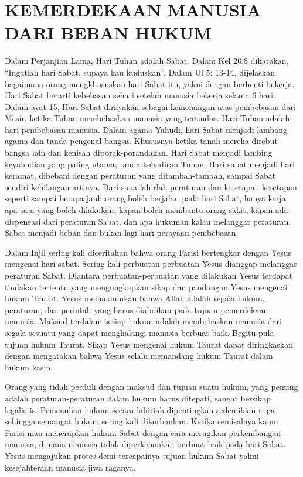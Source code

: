 \newpage
\section*{KEMERDEKAAN MANUSIA DARI BEBAN HUKUM}
	Dalam Perjanjian Lama, Hari Tuhan adalah Sabat. Dalam Kel 20:8 dikatakan, “Ingatlah hari Sabat, supaya kau kuduskan”. Dalam Ul 5: 13-14, dijelaskan bagaimana orang mengkhususkan hari Sabat itu, yakni dengan berhenti bekerja. Hari Sabat berarti kebebasan sehari setelah manusia bekerja selama 6 hari. Dalam ayat 15, Hari Sabat dirayakan sebagai kemenangan atas pembebasan dari Mesir, ketika Tuhan membebaskan manusia yang tertindas. Hari Tuhan adalah hari pembebasan manusia. Dalam agama Yahudi, hari Sabat menjadi lambang agama dan tanda pengenal bangsa. Khususnya ketika tanah mereka direbut bangsa lain dan kenisah diporak-porandakan. Hari Sabat menjadi lambing keyahudian yang paling utama, tanda kehadiran Tuhan. Hari sabat menjadi hari keramat, dibebani dengan peraturan yang ditambah-tambah, sampai Sabat sendiri kehilangan artinya. Dari sana lahirlah peraturan dan ketetapan-ketetapan seperti sampai berapa jauh orang boleh berjalan pada hari Sabat, hanya kerja apa saja yang boleh dilakukan, kapan boleh membantu orang sakit, kapan ada dispensasi dari peraturan Sabat, dan apa hukuman kalau melanggar peraturan. Sabat menjadi beban dan bukan lagi hari perayaan pembebasan.

Dalam Injil sering kali diceritakan bahwa orang Farisi bertengkar dengan Yesus mengenai hari sabat. Sering kali perbuatan-perbuatan Yesus dianggap melanggar peraturan Sabat. Diantara perbuatan-perbuatan yang dilakukan Yesus terdapat tindakan tertentu yang mengungkapkan sikap dan pandangan Yesus mengenai hukum Taurat. Yesus memaklumkan bahwa Allah adalah segala hukum, peraturan, dan perintah yang harus diabdikan pada tujuan pemerdekaan manusia. Maksud terdalam setiap hukum adalah membebaskan manusia dari segala sesuatu yang dapat menghalangi manusia berbuat baik. Begitu pula tujuan hukum Taurat. Sikap Yesus mengenai hukum Taurat dapat diringkaskan dengan mengatakan bahwa Yesus selalu memandang hukum Taurat dalam hukum kasih.

	Orang yang tidak perduli dengan maksud dan tujuan suatu hukum, yang penting adalah peraturan-peraturan dalam hukum harus ditepati, sangat bersikap legalistis. Pemenuhan hukum secara lahiriah dipentingkan sedemikian rupa sehingga semangat hukum sering kali dikorbankan. Ketika semisalnya kaum Farisi mau menerapkan hukum Sabat dengan cara merugikan perkembangan manusia, dimana manusia tidak diperkenankan berbuat baik pada hari Sabat. Yesus mengajukan protes demi tercapainya tujuan hukum Sabat yakni kesejahteraan manusia jiwa raganya. 

